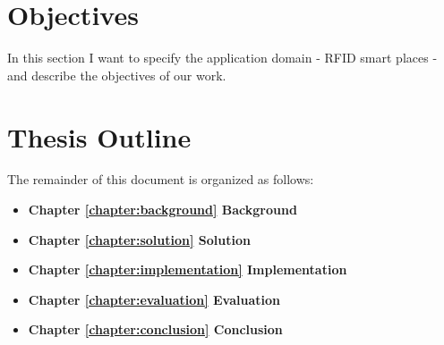 \section{Objectives}
\label{section:objectives}
In this section I want to specify the application domain - RFID smart places - and describe the
objectives of our work.
\section{Thesis Outline}
\label{section:outline}
The remainder of this document is organized as follows:
\begin{itemize}
  \item \textbf{Chapter \ref{chapter:background} Background}
  \item \textbf{Chapter \ref{chapter:solution} Solution}
  \item \textbf{Chapter \ref{chapter:implementation} Implementation}
  \item \textbf{Chapter \ref{chapter:evaluation} Evaluation}
  \item \textbf{Chapter \ref{chapter:conclusion} Conclusion}
\end{itemize}
